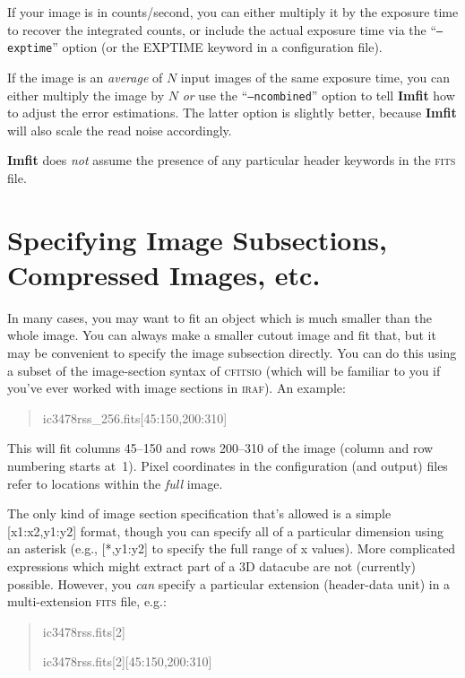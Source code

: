 \documentclass[10pt,a4paper,article]{memoir}
\newcommand{\imfit}{\textbf{Imfit}}
\newcommand{\Imfit}{\textbf{Imfit}}
\begin{document}
If your image is in counts/second, you can either multiply it by the
exposure time to recover the integrated counts, or include the actual
exposure time via the ``\texttt{--exptime}'' option (or the EXPTIME keyword
in a configuration file).

If the image is an \textit{average} of $N$ input images of the same exposure time, you
can either multiply the image by $N$ \textit{or} use the ``\texttt{--ncombined}'' option
to tell \imfit{} how to adjust the error estimations.  The latter option is slightly
better, because \imfit{} will also scale the read noise accordingly.

\Imfit{} does \textit{not} assume the presence of any particular header
keywords in the \textsc{fits} file.




\section{Specifying Image Subsections, Compressed Images, etc.}

In many cases, you may want to fit an object which is much smaller than the whole
image. You can always make a smaller cutout image and fit that, but it may be convenient to
specify the image subsection directly. You can do this using a subset of the image-section
syntax of \textsc{cfitsio} (which will be familiar to you if you've ever worked with
image sections in \textsc{iraf}). An example:

\begin{quote}
ic3478rss\_256.fits[45:150,200:310]
\end{quote}
This will fit columns 45--150 and rows 200--310 of the image (column and row
numbering starts at~1). Pixel coordinates in the configuration (and output)
files refer to locations within the \textit{full} image.

The only kind of image section specification that's allowed is a simple
[x1:x2,y1:y2] format, though you can specify all of a particular dimension using
an asterisk (e.g., [*,y1:y2] to specify the full range of x values). More
complicated expressions which might extract part of a 3D datacube are not
(currently) possible. However, you \textit{can} specify a particular extension
(header-data unit) in a multi-extension \textsc{fits} file, e.g.:

\begin{quote}
ic3478rss.fits[2]

ic3478rss.fits[2][45:150,200:310]
\end{quote}
\end{document}
